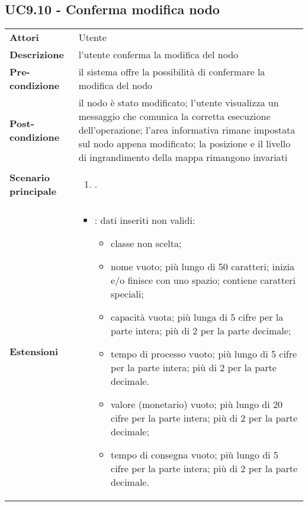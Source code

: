 \subsection{UC9.10 - Conferma modifica nodo} 
\label{sssec:UC9.10} 
\def\arraystretch{1.5}
\begin{tabularx}{\textwidth}{l|p{}}
	\rowcolor{I} \multicolumn{2}{c}{\color{white}\textbf{UC9.10 - Conferma modifica nodo}} \\
	\toprule
	\endhead
	\textbf{Attori} & Utente\\
	\textbf{Descrizione} & l'utente conferma la modifica del nodo\\
	\textbf{Pre-condizione} & il sistema offre la possibilità di confermare la modifica del nodo\\
	\textbf{Post-condizione} & il nodo è stato modificato;  l'utente visualizza un messaggio che comunica la corretta esecuzione dell'operazione; l'area informativa rimane impostata sul nodo appena modificato; la posizione e il livello di ingrandimento della mappa rimangono invariati\\
	\textbf{Scenario principale} & \vspace{-1.2em}\begin{enumerate}[leftmargin=*,noitemsep,nosep]
		\item \nameref{sssec:UC9.10}.
	\end{enumerate}\\
	\textbf{Estensioni} & \vspace{-1.2em}\begin{itemize}[leftmargin=*,noitemsep,nosep]
		\item \nameref{sssec:UC9.11}: dati inseriti non validi:
		\begin{itemize}
			\item classe non scelta;
			\item nome vuoto; più lungo di 50
			caratteri; inizia e/o finisce con uno spazio; contiene caratteri
			speciali;
			\item capacità vuota; più lunga di 5
			cifre per la parte intera; più di 2 per la parte decimale;
			\item tempo di processo vuoto; più lungo di 5 cifre per la parte intera; più di 2 per la parte decimale.
			\item valore (monetario) vuoto; più
			lungo di 20 cifre per la parte intera; più di 2 per la parte
			decimale;
			\item tempo di consegna vuoto; più lungo di 5 cifre per la parte intera; più di 2 per la parte decimale.
		\end{itemize}
	\end{itemize}\\
	\bottomrule
\end{tabularx}
